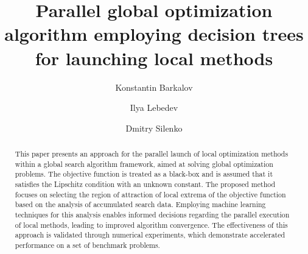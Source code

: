 \documentclass[runningheads]{llncs}
\begin{document}
%
\title{Parallel global optimization algorithm employing decision trees for launching local methods}
%
%
\author{Konstantin Barkalov \and
Ilya Lebedev \and
Dmitry Silenko }
%
%
%
\maketitle              %
%
\begin{abstract}

This paper presents an approach for the parallel launch of local optimization methods within a global search algorithm framework, aimed at solving global optimization problems. The objective function is treated as a black-box and is assumed that it satisfies the Lipschitz condition with an unknown constant. The proposed method focuses on selecting the region of attraction of local extrema of the objective function based on the analysis of accumulated search data. Employing machine learning techniques for this analysis enables informed decisions regarding the parallel execution of local methods, leading to improved algorithm convergence. The effectiveness of this approach is validated through numerical experiments, which demonstrate accelerated performance on a set of benchmark problems.


\end{abstract}
%
%
%
\end{document}
